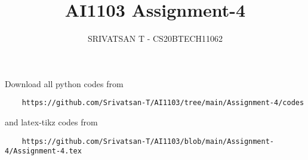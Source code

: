 \documentclass[journal,12pt,twocolumn]{IEEEtran}
\DeclareMathOperator*{\Res}{Res}
\begin{document}
\newcommand{\BEQA}{\begin{eqnarray}}
        \newcommand{\EEQA}{\end{eqnarray}}
\newcommand{\define}{\stackrel{\triangle}{=}}

\raggedbottom
\setlength{\parindent}{0pt}
\providecommand{\mbf}{\mathbf}
\providecommand{\pr}[1]{\ensuremath{\Pr\left(#1\right)}}
\providecommand{\qfunc}[1]{\ensuremath{Q\left(#1\right)}}
\providecommand{\sbrak}[1]{\ensuremath{{}\left[#1\right]}}
\providecommand{\lsbrak}[1]{\ensuremath{{}\left[#1\right.}}
\providecommand{\rsbrak}[1]{\ensuremath{{}\left.#1\right]}}
\providecommand{\brak}[1]{\ensuremath{\left(#1\right)}}
\providecommand{\lbrak}[1]{\ensuremath{\left(#1\right.}}
\providecommand{\rbrak}[1]{\ensuremath{\left.#1\right)}}
\providecommand{\cbrak}[1]{\ensuremath{\left\{#1\right\}}}
\providecommand{\lcbrak}[1]{\ensuremath{\left\{#1\right.}}
\providecommand{\rcbrak}[1]{\ensuremath{\left.#1\right\}}}
\theoremstyle{remark}
\newtheorem{rem}{Remark}
\newcommand{\sgn}{\mathop{\mathrm{sgn}}}
\providecommand{\abs}[1]{\vert#1\vert}
\providecommand{\res}[1]{\Res\displaylimits_{#1}}
\providecommand{\norm}[1]{\lVert#1\rVert}
\providecommand{\mtx}[1]{\mathbf{#1}}
\providecommand{\mean}[1]{E[#1]}
\providecommand{\fourier}{\overset{\mathcal{F}}{ \rightleftharpoons}}
\providecommand{\system}{\overset{\mathcal{H}}{ \longleftrightarrow}}
\newcommand{\solution}{\noindent \textbf{Solution: }}
\newcommand{\cosec}{\,\text{cosec}\,}
\newcommand{\comb}[2]{{}^{#1}\mathrm{C}_{#2}}
\providecommand{\dec}[2]{\ensuremath{\overset{#1}{\underset{#2}{\gtrless}}}}
\newcommand{\myvec}[1]{\ensuremath{\begin{pmatrix}#1\end{pmatrix}}}
\newcommand{\mydet}[1]{\ensuremath{\begin{vmatrix}#1\end{vmatrix}}}
\makeatletter
{}
\makeatother
\let\StandardTheFigure\thefigure
\let\vec\mathbf
\renewcommand{\thefigure}{\theproblem}
\def\putbox#1#2#3{\makebox[0in][l]{\makebox[#1][l]{}\raisebox{\baselineskip}[0in][0in]{\raisebox{#2}[0in][0in]{#3}}}}
\def\rightbox#1{\makebox[0in][r]{#1}}
\def\centbox#1{\makebox[0in]{#1}}
\def\topbox#1{\raisebox{-\baselineskip}[0in][0in]{#1}}
\def\midbox#1{\raisebox{-0.5\baselineskip}[0in][0in]{#1}}
\vspace{3cm}
\title{AI1103 Assignment-4}
\author{SRIVATSAN T - CS20BTECH11062}
\maketitle
\newpage
\bigskip
\renewcommand{\thefigure}{\theenumi}
\renewcommand{\thetable}{\theenumi}
Download all python codes from
\begin{lstlisting}
    https://github.com/Srivatsan-T/AI1103/tree/main/Assignment-4/codes
\end{lstlisting}
%
and latex-tikz codes from
%
\begin{lstlisting}
    https://github.com/Srivatsan-T/AI1103/blob/main/Assignment-4/Assignment-4.tex
\end{lstlisting}
\end{document}
